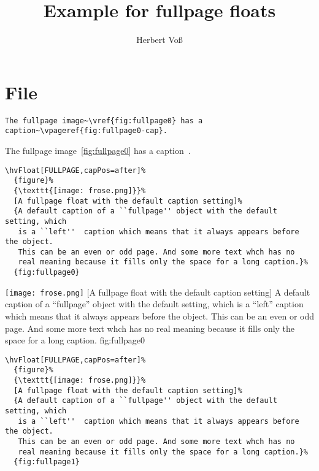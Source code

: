 \documentclass{scrartcl}
\begin{document}
\title{Example for fullpage floats}
\author{Herbert Voß}
\maketitle

\tableofcontents
\blindtext

\blindtext

\section{File \texttt{\jobname}}

\begin{lstlisting}
The fullpage image~\vref{fig:fullpage0} has a caption~\vpageref{fig:fullpage0-cap}.
\end{lstlisting}

The fullpage image~\vref{fig:fullpage0} has a caption~.

\begin{lstlisting}
\hvFloat[FULLPAGE,capPos=after]%
  {figure}%
  {\texttt{[image: frose.png]}}%
  [A fullpage float with the default caption setting]%
  {A default caption of a ``fullpage'' object with the default setting, which
   is a ``left''  caption which means that it always appears before the object.
   This can be an even or odd page. And some more text whch has no
   real meaning because it fills only the space for a long caption.}%
  {fig:fullpage0}
\end{lstlisting}


\Float[capPos=after]
%
  {\texttt{[image: frose.png]}}%
  [A fullpage float with the default caption setting]%
  {A default caption of a ``fullpage'' object with the default setting, which
   is a ``left''  caption which means that it always appears before the object.
   This can be an even or odd page. And some more text whch has no
   real meaning because it fills only the space for a long caption.}%
  {fig:fullpage0}

\Blindtext

\Blindtext

\begin{lstlisting}
\hvFloat[FULLPAGE,capPos=after]%
  {figure}%
  {\texttt{[image: frose.png]}}%
  [A fullpage float with the default caption setting]%
  {A default caption of a ``fullpage'' object with the default setting, which
   is a ``left''  caption which means that it always appears before the object.
   This can be an even or odd page. And some more text whch has no
   real meaning because it fills only the space for a long caption.}%
  {fig:fullpage1}
\end{lstlisting}
\end{document}
